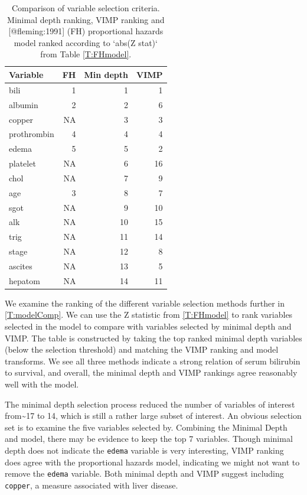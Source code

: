 \documentclass[article]{jss}
\begin{document}
\begin{Schunk}
\begin{table}

\caption{\label{tab:models}Comparison of variable selection criteria. Minimal depth ranking, VIMP ranking and [@fleming:1991] (FH) proportional hazards model ranked according to `abs(Z stat)` from Table \ref{T:FHmodel}.\label{T:modelComp}}
\centering
\begin{tabular}[t]{l|r|r|r}
\hline
Variable & FH & Min depth & VIMP\\
\hline
bili & 1 & 1 & 1\\
\hline
albumin & 2 & 2 & 6\\
\hline
copper & NA & 3 & 3\\
\hline
prothrombin & 4 & 4 & 4\\
\hline
edema & 5 & 5 & 2\\
\hline
platelet & NA & 6 & 16\\
\hline
chol & NA & 7 & 9\\
\hline
age & 3 & 8 & 7\\
\hline
sgot & NA & 9 & 10\\
\hline
alk & NA & 10 & 15\\
\hline
trig & NA & 11 & 14\\
\hline
stage & NA & 12 & 8\\
\hline
ascites & NA & 13 & 5\\
\hline
hepatom & NA & 14 & 11\\
\hline
\end{tabular}
\end{table}

\end{Schunk}

We examine the ranking of the different variable selection methods
further in \autoref{T:modelComp}. We can use the Z statistic from
\autoref{T:FHmodel} to rank variables selected in
the\citep{fleming:1991} model to compare with variables selected by
minimal depth and VIMP. The table is constructed by taking the top
ranked minimal depth variables (below the selection threshold) and
matching the VIMP ranking and\citep{fleming:1991} model transforms. We
see all three methods indicate a strong relation of serum bilirubin to
survival, and overall, the minimal depth and VIMP rankings agree
reasonably well with the\citep{fleming:1991} model.

The minimal depth selection process reduced the number of variables of
interest from\textasciitilde{}17 to 14, which is still a rather large
subset of interest. An obvious selection set is to examine the five
variables selected by\citep{fleming:1991}. Combining the Minimal Depth
and\citep{fleming:1991} model, there may be evidence to keep the top 7
variables. Though minimal depth does not indicate the \texttt{edema}
variable is very interesting, VIMP ranking does agree with the
proportional hazards model, indicating we might not want to remove the
\texttt{edema} variable. Both minimal depth and VIMP suggest including
\texttt{copper}, a measure associated with liver disease.
\end{document}
